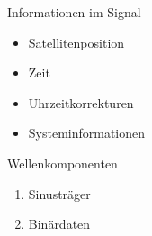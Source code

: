 \begin{multicols}{2}
    Informationen im Signal
    \begin{itemize}
        \item Satellitenposition
        \item Zeit
        \item Uhrzeitkorrekturen
        \item Systeminformationen
    \end{itemize}
    \columnbreak
    Wellenkomponenten
    \begin{enumerate}
        \item Sinusträger
        \item Binärdaten
    \end{enumerate}
\end{multicols}
